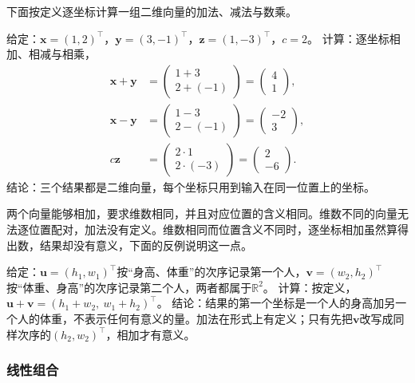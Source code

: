 下面按定义逐坐标计算一组二维向量的加法、减法与数乘。
\begin{example}
\label{ex:ls-vector-addition-scaling}
给定：$\bm x=(1,2)^\top$，$\bm y=(3,-1)^\top$，$\bm z=(1,-3)^\top$，$c=2$。
计算：逐坐标相加、相减与相乘，
\[
 \begin{aligned}
 \bm x+\bm y&=\begin{pmatrix}1+3\\2+(-1)\end{pmatrix}=\begin{pmatrix}4\\1\end{pmatrix},\\
 \bm x-\bm y&=\begin{pmatrix}1-3\\2-(-1)\end{pmatrix}=\begin{pmatrix}-2\\3\end{pmatrix},\\
 c\bm z&=\begin{pmatrix}2\cdot1\\2\cdot(-3)\end{pmatrix}=\begin{pmatrix}2\\-6\end{pmatrix}.
 \end{aligned}
\]
结论：三个结果都是二维向量，每个坐标只用到输入在同一位置上的坐标。
\end{example}

两个向量能够相加，要求维数相同，并且对应位置的含义相同。维数不同的向量无法逐位置配对，加法没有定义。维数相同而位置含义不同时，逐坐标相加虽然算得出数，结果却没有意义，下面的反例说明这一点。
\begin{example}[反例：维数相同而位置含义不同]
\label{ex:ls-mismatched-positions}
给定：$\bm u=(h_1,w_1)^\top$按“身高、体重”的次序记录第一个人，$\bm v=(w_2,h_2)^\top$按“体重、身高”的次序记录第二个人，两者都属于$\mathbb R^2$。
计算：按定义，$\bm u+\bm v=(h_1+w_2,\ w_1+h_2)^\top$。
结论：结果的第一个坐标是一个人的身高加另一个人的体重，不表示任何有意义的量。加法在形式上有定义；只有先把$\bm v$改写成同样次序的$(h_2,w_2)^\top$，相加才有意义。
\end{example}

\subsubsection{线性组合}

